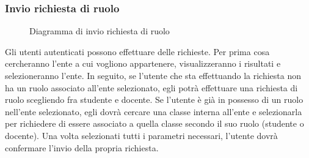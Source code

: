 \documentclass[a4paper, titlepage]{article}
\begin{document}
\subsubsection{Invio richiesta di ruolo}
\begin{figure}[H]
	\centering
	\noindent{}
	\caption{Diagramma di invio richiesta di ruolo}
\end{figure}
Gli utenti autenticati possono effettuare delle richieste. Per prima cosa cercheranno l’ente a cui vogliono appartenere, visualizzeranno i risultati e selezioneranno l’ente. In seguito, se l’utente che sta effettuando la richiesta non ha un ruolo associato all’ente selezionato, egli potrà effettuare una richiesta di ruolo scegliendo fra studente e docente. Se l’utente è già in possesso di un ruolo nell’ente selezionato, egli dovrà cercare una classe interna all’ente e selezionarla per richiedere di essere associato a quella classe secondo il suo ruolo (studente o docente). Una volta selezionati tutti i parametri necessari, l’utente dovrà confermare l’invio della propria richiesta.
\end{document}
